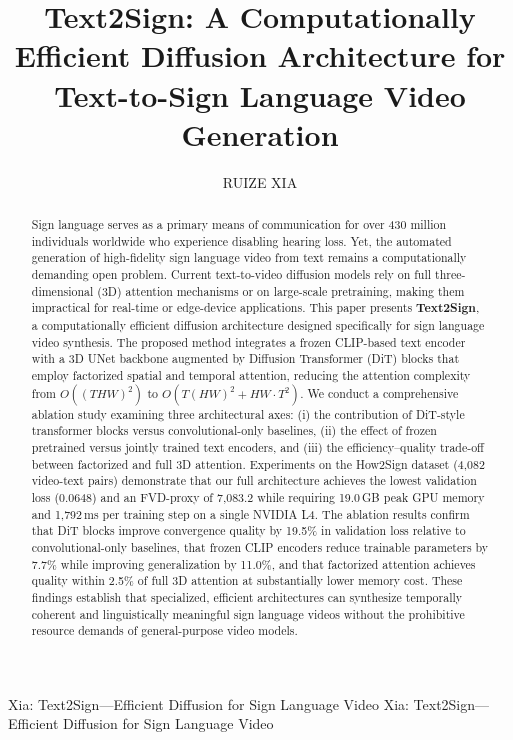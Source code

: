 \documentclass{ieeeaccess}
\begin{document}

\title{Text2Sign: A Computationally Efficient Diffusion Architecture for Text-to-Sign Language Video Generation}
\author{
\uppercase{Ruize Xia}
\address[]{Independent Researcher (e-mail: xiaruize0911@gmail.com)}
}


\markboth
{Xia: Text2Sign---Efficient Diffusion for Sign Language Video}
{Xia: Text2Sign---Efficient Diffusion for Sign Language Video}

\begin{abstract}
    
Sign language serves as a primary means of communication for over 430 million individuals worldwide who experience disabling hearing loss. Yet, the automated generation of high-fidelity sign language video from text remains a computationally demanding open problem. Current text-to-video diffusion models rely on full three-dimensional (3D) attention mechanisms or on large-scale pretraining, making them impractical for real-time or edge-device applications. This paper presents \textbf{Text2Sign}, a computationally efficient diffusion architecture designed specifically for sign language video synthesis. The proposed method integrates a frozen CLIP-based text encoder with a 3D UNet backbone augmented by Diffusion Transformer (DiT) blocks that employ factorized spatial and temporal attention, reducing the attention complexity from $O((THW)^2)$ to $O(T(HW)^2 + HW \cdot T^2)$. We conduct a comprehensive ablation study examining three architectural axes: (i) the contribution of DiT-style transformer blocks versus convolutional-only baselines, (ii) the effect of frozen pretrained versus jointly trained text encoders, and (iii) the efficiency--quality trade-off between factorized and full 3D attention. Experiments on the How2Sign dataset (4,082 video-text pairs) demonstrate that our full architecture achieves the lowest validation loss (0.0648) and an FVD-proxy of 7,083.2 while requiring 19.0\,GB peak GPU memory and 1,792\,ms per training step on a single NVIDIA L4. The ablation results confirm that DiT blocks improve convergence quality by 19.5\% in validation loss relative to convolutional-only baselines, that frozen CLIP encoders reduce trainable parameters by 7.7\% while improving generalization by 11.0\%, and that factorized attention achieves quality within 2.5\% of full 3D attention at substantially lower memory cost. These findings establish that specialized, efficient architectures can synthesize temporally coherent and linguistically meaningful sign language videos without the prohibitive resource demands of general-purpose video models.
\end{abstract}
\end{document}
